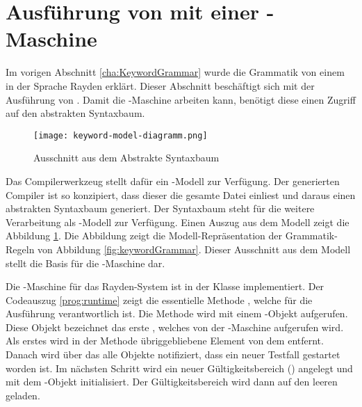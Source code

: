 
\section{Ausführung von  mit einer -Maschine}
\label{cha:StackMachine}

Im vorigen Abschnitt \ref{cha:KeywordGrammar} wurde die Grammatik von einem  in der Sprache Rayden erklärt. Dieser Abschnitt beschäftigt sich mit der Ausführung von . Damit die -Maschine arbeiten kann, benötigt diese einen Zugriff auf den abstrakten Syntaxbaum. 

\begin{figure}
\centering
\texttt{[image: keyword-model-diagramm.png]}
\caption{Ausschnitt aus dem Abstrakte Syntaxbaum}
\label{fig:AST}
\end{figure}

\SuperPar
Das Compilerwerkzeug  stellt dafür ein -Modell zur Verfügung. Der generierten Compiler ist so konzipiert, dass dieser die gesamte Datei einliest und daraus einen abstrakten Syntaxbaum generiert. Der Syntaxbaum steht für die weitere Verarbeitung als -Modell zur Verfügung. Einen Auszug aus dem Modell zeigt die Abbildung \ref{fig:AST}. Die Abbildung zeigt die Modell-Repräsentation der Grammatik-Regeln von Abbildung \ref{fig:keywordGrammar}. Dieser Ausschnitt aus dem Modell stellt die Basis für die -Maschine dar. 

\SuperPar
Die -Maschine für das Rayden-System ist in der Klasse  implementiert. Der Codeauszug \ref{prog:runtime} zeigt die essentielle Methode , welche für die Ausführung verantwortlich ist. Die Methode wird mit einem -Objekt aufgerufen. Diese Objekt bezeichnet das erste , welches von der -Maschine aufgerufen wird. Als erstes wird in der Methode übriggebliebene Element von dem  entfernt. Danach wird über das  alle Objekte notifiziert, dass ein neuer Testfall gestartet worden ist. Im nächsten Schritt wird ein neuer Gültigkeitsbereich () angelegt und mit dem -Objekt initialisiert. Der Gültigkeitsbereich wird dann auf den leeren  geladen. 

